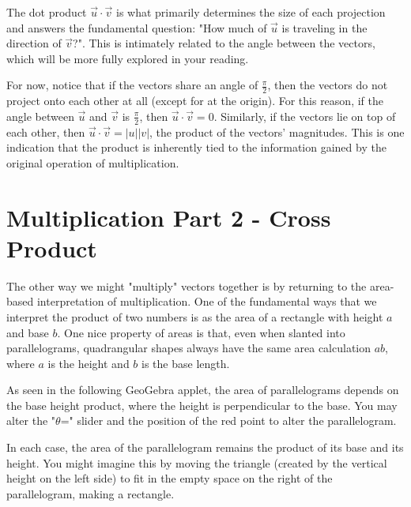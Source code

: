 \documentclass{ximera}
\begin{document}
\begin{center}
\end{center}

The dot product $\vec u\cdot\vec v$ is what primarily determines the size of each projection and answers the fundamental question: "How much of $\vec u$ is traveling in the direction of $\vec v$?". This is intimately related to the angle between the vectors, which will be more fully explored in your reading.

For now, notice that if the vectors share an angle of $\frac{\pi}{2}$, then the vectors do not project onto each other at all (except for at the origin). For this reason, if the angle between $\vec u$ and $\vec v$ is $\frac{\pi}{2}$, then $\vec u\cdot\vec v=0$. Similarly, if the vectors lie on top of each other, then $\vec u\cdot\vec v=|u||v|$, the product of the vectors' magnitudes. This is one indication that the product is inherently tied to the information gained by the original operation of multiplication.

\section{Multiplication Part 2 - Cross Product}

The other way we might "multiply" vectors together is by returning to the area-based interpretation of multiplication. One of the fundamental ways that we interpret the product of two numbers is as the area of a rectangle with height $a$ and base $b$. One nice property of areas is that, even when slanted into parallelograms, quadrangular shapes always have the same area calculation $ab$, where $a$ is the height and $b$ is the base length.

As seen in the following GeoGebra applet, the area of parallelograms depends on the base height product, where the height is perpendicular to the base. You may alter the "$\theta$=" slider and the position of the red point to alter the parallelogram.

\begin{center}
\end{center}

In each case, the area of the parallelogram remains the product of its base and its height. You might imagine this by moving the triangle (created by the vertical height on the left side) to fit in the empty space on the right of the parallelogram, making a rectangle.
\end{document}

